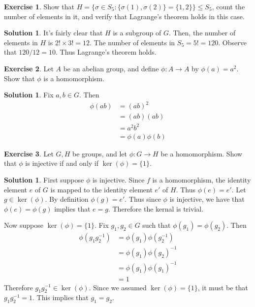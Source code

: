 \documentclass[12pt]{article}
\theoremstyle{definition}
\newtheorem{exercise}{Exercise}
\theoremstyle{definition}
\newtheorem{solution}[theorem]{Solution}
\begin{document}
\begin{exercise}
Show that $H = \{\sigma \in S_5 : \{\sigma(1), \sigma(2) \} = \{1,2\} \} \leq S_5$, count the number of elements in it, and verify that Lagrange's theorem holds in this case.
\end{exercise}
\begin{solution}
It's fairly clear that $H$ is a subgroup of $G$. Then, the number of elements in $H$ is $2! \times 3! = 12$. The number of elements in $S_5 = 5! = 120$. Observe that $120 / 12 = 10$. Thus Lagrange's theorem holds. 
\end{solution}

\begin{exercise}
Let $A$ be an abelian group, and define $\phi : A \to A$ by $\phi(a) = a^2$. Show that $\phi$ is a homomorphism. 
\end{exercise}
\begin{solution}
Fix $a,b \in G$. Then
\begin{align*}
\phi(ab) &= (ab)^2 \\
&= (ab) (ab) \\
&= a^2 b^2 \tag{since $A$ is abelian} \\
&= \phi(a) \phi(b)
\end{align*}
\end{solution}

\begin{exercise}
Let $G, H$ be groups, and let $\phi : G \to H$ be a homomorphism. Show that $\phi$ is injective if and only if $\ker(\phi) = \{1\}$.
\end{exercise}
\begin{solution}
First suppose $\phi$ is injective. Since $f$ is a homomorphism, the identity element $e$ of $G$ is mapped to the identity element $e'$ of $H$. Thus $\phi(e) = e'$. Let $g \in \ker(\phi)$. By definition $\phi(g) = e'$. Thus since $\phi$ is injective, we have that $\phi(e) = \phi(g)$ implies that $e = g$. Therefore the kernal is trivial.

Now suppose $\ker(\phi) = \{1\}$. Fix $g_1, g_2 \in G$ such that $\phi(g_1) = \phi(g_2)$. Then
\begin{align*}
\phi(g_1 g_2^{-1}) &= \phi(g_1) \phi(g_2^{-1}) \tag{$\phi$ is a homomorphism}\\
&= \phi(g_1) \phi(g_2)^{-1} \tag{property of homomorphism} \\
&= \phi(g_1) \phi(g_1)^{-1} \tag{since $\phi(g_1) = \phi(g_2)$} \\
&= 1
\end{align*} 
Therefore $g_1 g_2^{-1} \in \ker(\phi)$. Since we assumed $\ker(\phi) = \{1\}$, it must be that $g_1 g_2^{-1} = 1$. This implies that $g_1 = g_2$.
\end{solution}
\end{document}
